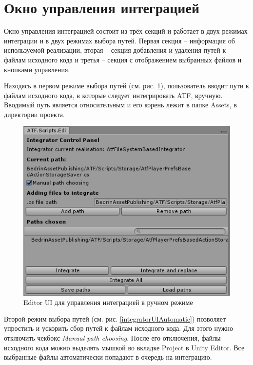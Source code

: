 \section{Окно управления интеграцией}

Окно управления интеграцией состоит из трёх секций и работает в двух режимах интеграции и в двух режимах выбора путей. Первая секция -- информация об используемой реализации, вторая -- секция добавления и удаления путей к файлам исходного кода и третья -- секция с отображением выбранных файлов и кнопками управления.

Находясь в первом режиме выбора путей (см. рис. \ref{integratorUI}), пользователь вводит пути к файлам исходного кода, в которые следует интегрировать ATF, вручную. Вводимый путь является относительным и его корень лежит в папке Assets, в директории проекта. 

\begin{figure}[h]
	\centering
	\includegraphics[width=0.7\linewidth]{integrator_manual.PNG}
	\caption{Editor UI для управления интеграцией в ручном режиме}
	\label{integratorUI}
\end{figure}

Второй режим выбора путей (см. рис. \ref{integratorUIAutomatic}) позволяет упростить и ускорить сбор путей к файлам исходного кода. Для этого нужно отключить чекбокс \textit{Manual path choosing}. После его отключения, файлы исходного кода можно выделять мышкой во вкладке Project в Unity Editor. Все выбранные файлы автоматически попадают в очередь на интеграцию.

